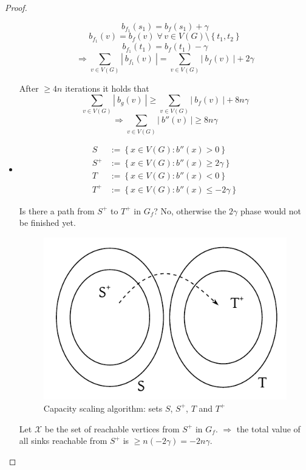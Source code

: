 \documentclass[a4paper]{article}
\theoremstyle{definition}
\newcommand{\card}[1]{\left|\:\!#1\:\!\right|}
\newcommand{\set}[1]{\left\{#1\right\}}
\newcommand{\fall}{\;\forall\,}
\begin{document}
\begin{proof}
\begin{itemize}
      \[ b_{f_1}(s_1) = b_{f}(s_1) + \gamma \]
      \[ b_{f_1}(v) = b_{f}(v) \fall v \in V(G) \setminus \set{t_1, t_2} \]
      \[ b_{f_1}(t_1) = b_{f}(t_1) - \gamma \]
      \[ \Rightarrow \sum_{v \in V(G)} \card{b_{f_1}(v)} = \sum_{v \in V(G)} \card{b_f(v)} + 2 \gamma \]

      After $\geq 4n$ iterations it holds that
      \[
        \sum_{v \in V(G)} \card{b_g(v)} \geq \sum_{v \in V(G)} \card{b_f(v)} + 8n\gamma
      \] \[
        \Rightarrow \sum_{v \in V(G)} \card{b''(v)} \geq 8n\gamma
      \]

    \item
      \begin{align*}
          S   &:= \set{x \in V(G): b''(x) > 0} \\
          S^+ &:= \set{x \in V(G): b''(x) \geq 2\gamma} \\
          T   &:= \set{x \in V(G): b''(x) < 0} \\
          T^+ &:= \set{x \in V(G): b''(x) \leq -2\gamma}
      \end{align*}

      Is there a path from $S^+$ to $T^+$ in $G_f$?
      No, otherwise the $2\gamma$ phase would not be finished yet.

      \begin{figure}[!ht]
        \begin{center}
          \includegraphics{img/capacity_scaling_algo_proof_sets.pdf}
          \caption{Capacity scaling algorithm: sets $S$, $S^+$, $T$ and $T^+$}
        \end{center}
      \end{figure}

      Let $\mathcal{X}$ be the set of reachable vertices from $S^+$ in $G_f$.
      $\Rightarrow$ the total value of all sinks reachable from $S^+$ is
      $\geq n (-2\gamma) = -2n\gamma$.


\end{itemize}
\end{proof}
\end{document}
